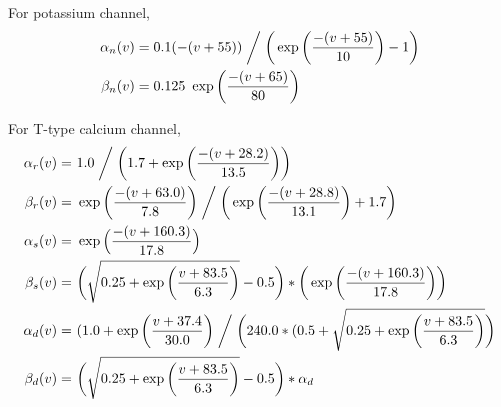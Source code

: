 For potassium channel, %
\begin{align*}
\alpha_{n}(v)&=0.1(-(v+55)) \biggm/ \bigg( \exp \bigg( \frac{-(v+55)}{10} \bigg) - 1 \bigg)\\
\beta_{n}(v)&=0.125\ \exp \bigg(\frac{-(v+65)}{80}\bigg)\\
\end{align*}

For T-type calcium channel, %
\begin{align*} %
\alpha_{r}(v) =&\ 1.0\biggm/ \bigg(1.7+\exp\bigg(\frac{-(v+28.2)}{13.5}\bigg)\bigg) \\
\beta_{r}(v) =&\ \exp\bigg(\frac{-(v+63.0)}{7.8}\bigg) \biggm/ \bigg( \exp \bigg( \frac{-(v+28.8)}{13.1} \bigg) +1.7\bigg)\\
\alpha_{s}(v) =&\ \exp \Big(\frac{-(v+160.3)}{17.8}\Big)\\
\beta_{s}(v) =&\ \bigg(\sqrt{0.25+\exp\bigg(\frac{v+83.5}{6.3}\bigg)}-0.5\bigg) * \bigg(\exp\bigg(\frac{-(v+160.3)}{17.8}\bigg)\bigg)\\
\alpha_{d}(v) =&\ (1.0+\exp\bigg(\frac{v+37.4}{30.0}\bigg) \biggm/ \bigg(240.0*(0.5+ \sqrt{0.25+\exp\bigg(\frac{v+83.5}{6.3} \bigg) } \bigg) \\
\beta_{d}(v) =&\ \bigg(\sqrt{0.25+\exp\bigg(\frac{v+83.5}{6.3} \bigg) } -0.5\bigg)*\alpha_d\\ 
\end{align*}

%
%
%
%



%
%
%
%
%
%

